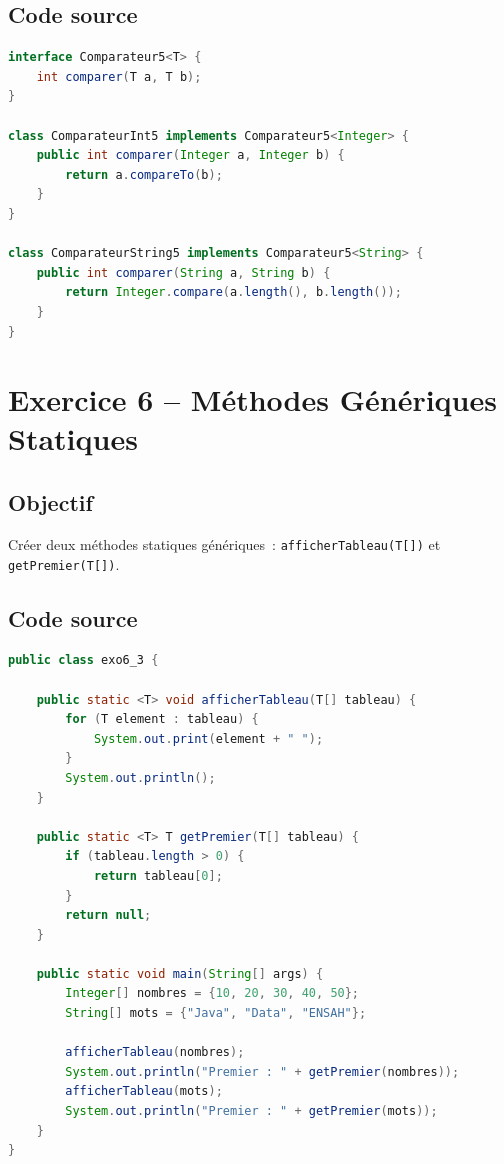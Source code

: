 \subsection{Code source}

\begin{lstlisting}[language=Java, caption={exo5\_3.java -- Comparateur5}]
interface Comparateur5<T> {
    int comparer(T a, T b);
}

class ComparateurInt5 implements Comparateur5<Integer> {
    public int comparer(Integer a, Integer b) {
        return a.compareTo(b);
    }
}

class ComparateurString5 implements Comparateur5<String> {
    public int comparer(String a, String b) {
        return Integer.compare(a.length(), b.length());
    }
}
\end{lstlisting}

\section{Exercice 6 -- Méthodes Génériques Statiques}

\subsection{Objectif}

Créer deux méthodes statiques génériques~: \texttt{afficherTableau(T[])}
et \texttt{getPremier(T[])}.

\subsection{Code source}

\begin{lstlisting}[language=Java, caption={exo6\_3.java -- Méthodes génériques statiques}]
public class exo6_3 {

    public static <T> void afficherTableau(T[] tableau) {
        for (T element : tableau) {
            System.out.print(element + " ");
        }
        System.out.println();
    }

    public static <T> T getPremier(T[] tableau) {
        if (tableau.length > 0) {
            return tableau[0];
        }
        return null;
    }

    public static void main(String[] args) {
        Integer[] nombres = {10, 20, 30, 40, 50};
        String[] mots = {"Java", "Data", "ENSAH"};

        afficherTableau(nombres);
        System.out.println("Premier : " + getPremier(nombres));
        afficherTableau(mots);
        System.out.println("Premier : " + getPremier(mots));
    }
}
\end{lstlisting}

